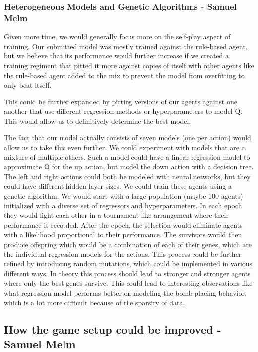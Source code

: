 \documentclass{article}
\begin{document}
\subsubsection[Heterogeneous Models and Genetic Algorithms]{Heterogeneous Models and Genetic Algorithms {\small - Samuel Melm}}

Given more time, we would generally focus more on the self-play aspect of training. Our submitted model was mostly trained against the rule-based agent, but we believe that its performance would further increase if we created a training regiment that pitted it more against copies of itself with other agents like the rule-based agent added to the mix to prevent the model from overfitting to only beat itself.  

This could be further expanded by pitting versions of our agents against one another that use different regression methods or hyperparameters to model Q. This would allow us to definitively determine the best model.

The fact that our model actually consists of seven models (one per action) would allow us to take this even further. We could experiment with models that are a mixture of multiple others. Such a model could have a linear regression model to approximate Q for the up action, but model the down action with a decision tree. The left and right actions could both be modeled with neural networks, but they could have different hidden layer sizes. We could train these agents using a genetic algorithm. We would start with a large population (maybe 100 agents) initialized with a diverse set of regressors and hyperparameters. In each epoch they would fight each other in a tournament like arrangement where their performance is recorded. After the epoch, the selection would eliminate agents with a likelihood proportional to their performance. The survivors would then produce offspring which would be a combination of each of their genes, which are the individual regression models for the actions. This process could be further refined by introducing random mutations, which could be implemented in various different ways. In theory this process should lead to stronger and stronger agents where only the best genes survive. This could lead to interesting observations like what regression model performs better on modeling the bomb placing behavior, which is a lot more difficult because of the sparsity of data.  

\subsection[How the game setup could be improved]{How the game setup could be improved {\small - Samuel Melm}}
\end{document}
